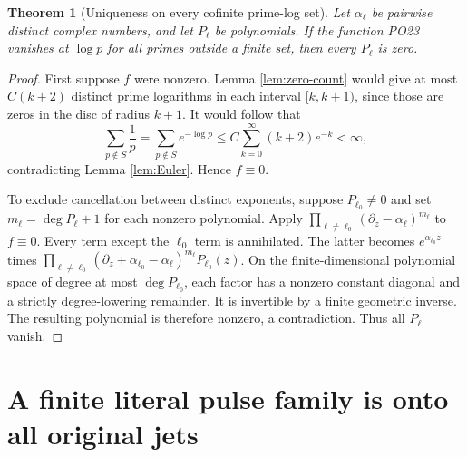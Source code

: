 \documentclass[11pt]{article}
\newtheorem{theorem}{Theorem}[section]
\begin{document}
\begin{theorem}[Uniqueness on every cofinite prime-log set]
\label{thm:prime-uniqueness}
Let \(\alpha_\ell\) be pairwise distinct complex numbers,
and let \(P_\ell\) be polynomials. If the function PO23
vanishes at \(\log p\) for all primes outside a finite set,
then every \(P_\ell\) is zero.
\end{theorem}
\begin{proof}
First suppose \(f\) were nonzero. Lemma \ref{lem:zero-count}
would give at most \(C(k+2)\) distinct prime logarithms in
each interval \([k,k+1)\), since those are zeros in the disc
of radius \(k+1\).
It would follow that
\[
 \sum_{p\notin S}\frac1p
   =\sum_{p\notin S}e^{-\log p}
   \le C\sum_{k=0}^\infty(k+2)e^{-k}<\infty,
 \tag{PO26}
\]
contradicting Lemma \ref{lem:Euler}. Hence \(f\equiv0\).

To exclude cancellation between distinct exponents, suppose
\(P_{\ell_0}\ne0\) and set
\(m_\ell=\deg P_\ell+1\) for each nonzero polynomial.
Apply
\(\prod_{\ell\ne\ell_0}(\partial_z-\alpha_\ell)^{m_\ell}\)
to \(f\equiv0\). Every term except the \(\ell_0\) term is
annihilated. The latter becomes \(e^{\alpha_{\ell_0}z}\)
times
\(\prod_{\ell\ne\ell_0}
  (\partial_z+\alpha_{\ell_0}-\alpha_\ell)^{m_\ell}
    P_{\ell_0}(z)\).
On the finite-dimensional polynomial space of degree at most
\(\deg P_{\ell_0}\), each factor has a nonzero constant
diagonal and a strictly degree-lowering remainder. It is
invertible by a finite geometric inverse. The resulting
polynomial is therefore nonzero, a contradiction.
Thus all \(P_\ell\) vanish.
\end{proof}

\section{A finite literal pulse family is onto all original jets}
\end{document}
